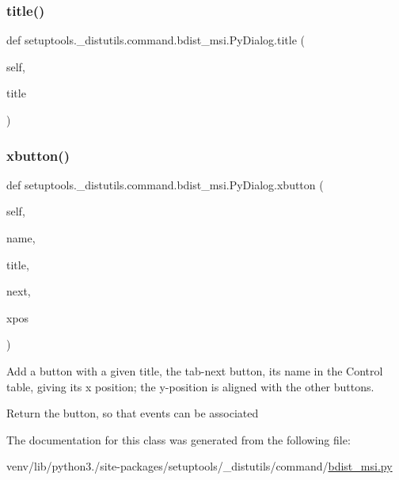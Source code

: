 \subsubsection{\texorpdfstring{title()}{title()}}
{\footnotesize\ttfamily def setuptools.\+\_\+distutils.\+command.\+bdist\+\_\+msi.\+Py\+Dialog.\+title (\begin{DoxyParamCaption}\item[{}]{self,  }\item[{}]{title }\end{DoxyParamCaption})}

\mbox{\label{classsetuptools_1_1__distutils_1_1command_1_1bdist__msi_1_1PyDialog_ae02f93634b3b0bfed34c7ea3e4e324b1}} 
\subsubsection{\texorpdfstring{xbutton()}{xbutton()}}
{\footnotesize\ttfamily def setuptools.\+\_\+distutils.\+command.\+bdist\+\_\+msi.\+Py\+Dialog.\+xbutton (\begin{DoxyParamCaption}\item[{}]{self,  }\item[{}]{name,  }\item[{}]{title,  }\item[{}]{next,  }\item[{}]{xpos }\end{DoxyParamCaption})}

\begin{DoxyVerb}Add a button with a given title, the tab-next button,
its name in the Control table, giving its x position; the
y-position is aligned with the other buttons.

Return the button, so that events can be associated\end{DoxyVerb}
 

The documentation for this class was generated from the following file\+:\begin{DoxyCompactItemize}
\item 
venv/lib/python3./site-\/packages/setuptools/\+\_\+distutils/command/\hyperlink{bdist__msi_8py}{bdist\+\_\+msi.\+py}\end{DoxyCompactItemize}
